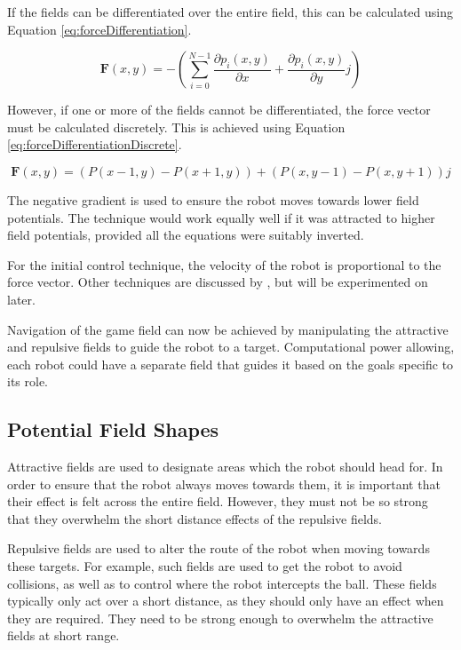 \documentclass[10pt]{article}
\begin{document}
If the fields can be differentiated over the entire field, this can be
calculated using Equation \ref{eq:forceDifferentiation}.

\begin{equation}
\boldsymbol{F}(x,y)=-\left(\sum_{i=0}^{N-1}\frac{\partial p_{i}\left(x,y\right)}{\partial x}+\frac{\partial p_{i}\left(x,y\right)}{\partial y}j\right)
\label{eq:forceDifferentiation}
\end{equation}

However, if one or more of the fields cannot be differentiated, the force vector
must be calculated discretely. This is achieved using Equation
\ref{eq:forceDifferentiationDiscrete}.

\begin{equation}
\boldsymbol{F}(x,y)=\left(P\left(x-1,y\right)-P\left(x+1,y\right)\right)+\left(P\left(x,y-1\right)-P\left(x,y+1\right)\right)j
\label{eq:forceDifferentiationDiscrete}
\end{equation}

The negative gradient is used to ensure the robot moves towards lower field
potentials. The technique would work equally well if it was attracted to higher
field potentials, provided all the equations were suitably inverted.

For the initial control technique, the velocity of the robot is proportional to
the force vector. Other techniques are discussed by
\cite{intelligentAlgorithmPathPlanning}, but will be experimented on later.

Navigation of the game field can now be achieved by manipulating the attractive
and repulsive fields to guide the robot to a target. Computational power
allowing, each robot could have a separate field that guides it based on the
goals specific to its role.

\subsection{Potential Field Shapes}

Attractive fields are used to designate areas which the robot should head for.
In order to ensure that the robot always moves towards them, it is important
that their effect is felt across the entire field. However, they must not be so
strong that they overwhelm the short distance effects of the repulsive fields.

Repulsive fields are used to alter the route of the robot when moving towards
these targets. For example, such fields are used to get the robot to avoid
collisions, as well as to control where the robot intercepts the ball. These
fields typically only act over a short distance, as they should only have an
effect when they are required. They need to be strong enough to overwhelm the
attractive fields at short range.
\end{document}
